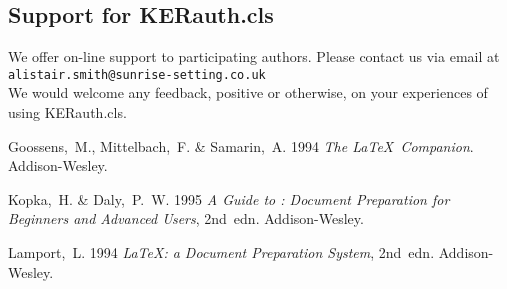 \documentclass{KERauth}
\begin{document}
\subsection{Support for \textsf{KERauth.cls}}
We offer on-line support to participating authors. Please
contact us via email at\\
\texttt{alistair.smith@sunrise-setting.co.uk}\\
We would welcome any feedback, positive or otherwise, on your
experiences of using \textsf{KERauth.cls}.

\begin{thebibliography}
\item
Goossens,~M., Mittelbach,~F. \& Samarin,~A. 1994 \emph{The \LaTeX\ Companion}.
Addison-Wesley.

\item
Kopka,~H. \& Daly,~P.~W. 1995 \emph{A Guide to \LaTeXe:
Document Preparation for Beginners and Advanced Users}, 2nd~edn.
Addison-Wesley.

\item
Lamport,~L. 1994 \emph{\LaTeX: a Document Preparation System}, 2nd~edn.                             %
Addison-Wesley.
\end{thebibliography}
\end{document}
